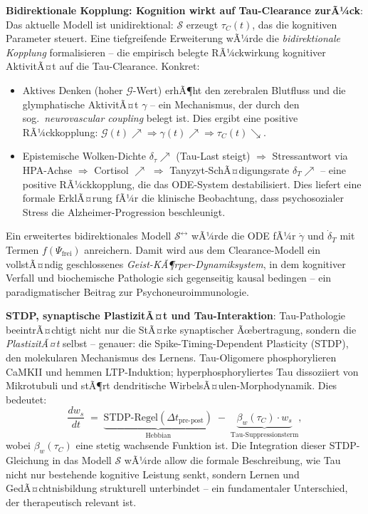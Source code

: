 ﻿\documentclass[12pt,a4paper]{article}
\theoremstyle{definition}
\begin{document}
	\textbf{Bidirektionale Kopplung: Kognition wirkt auf Tau-Clearance zurÃ¼ck}:
	Das aktuelle Modell ist unidirektional: $\mathcal{S}$ erzeugt $\tau_C(t)$, das die kognitiven Parameter steuert. Eine tiefgreifende Erweiterung wÃ¼rde die \emph{bidirektionale Kopplung} formalisieren -- die empirisch belegte RÃ¼ckwirkung kognitiver AktivitÃ¤t auf die Tau-Clearance. Konkret:
	\begin{itemize}
		\item Aktives Denken (hoher $\mathcal{G}$-Wert) erhÃ¶ht den zerebralen Blutfluss und die glymphatische AktivitÃ¤t $\gamma$ -- ein Mechanismus, der durch den sog.\ \emph{neurovascular coupling} belegt ist. Dies ergibt eine positive RÃ¼ckkopplung: $\mathcal{G}(t) \nearrow \Rightarrow \gamma(t) \nearrow \Rightarrow \tau_C(t) \searrow$.
		\item Epistemische Wolken-Dichte $\delta_\tau \nearrow$ (Tau-Last steigt) $\Rightarrow$ Stressantwort via HPA-Achse $\Rightarrow$ Cortisol $\nearrow$ $\Rightarrow$ Tanyzyt-SchÃ¤digungsrate $\delta_T \nearrow$ -- eine positive RÃ¼ckkopplung, die das ODE-System destabilisiert. Dies liefert eine formale ErklÃ¤rung fÃ¼r die klinische Beobachtung, dass psychosozialer Stress die Alzheimer-Progression beschleunigt.
	\end{itemize}
	Ein erweitertes bidirektionales Modell $\mathcal{S}^{\leftrightarrow}$ wÃ¼rde die ODE fÃ¼r $\dot{\gamma}$ und $\dot{\delta}_T$ mit Termen $f(\Psi_{\mathrm{frei}})$ anreichern. Damit wird aus dem Clearance-Modell ein vollstÃ¤ndig geschlossenes \emph{Geist-KÃ¶rper-Dynamiksystem}, in dem kognitiver Verfall und biochemische Pathologie sich gegenseitig kausal bedingen -- ein paradigmatischer Beitrag zur Psychoneuroimmunologie.

	\textbf{STDP, synaptische PlastizitÃ¤t und Tau-Interaktion}:
	Tau-Pathologie beeintrÃ¤chtigt nicht nur die StÃ¤rke synaptischer Ãœbertragung, sondern die \emph{PlastizitÃ¤t} selbst -- genauer: die Spike-Timing-Dependent Plasticity (STDP), den molekularen Mechanismus des Lernens. Tau-Oligomere phosphorylieren CaMKII und hemmen LTP-Induktion; hyperphosphoryliertes Tau dissoziiert von Mikrotubuli und stÃ¶rt dendritische WirbelsÃ¤ulen-Morphodynamik. Dies bedeutet:
	\[
		\frac{d w_s}{dt} \;=\; \underbrace{\text{STDP-Regel}(\Delta t_{\text{pre-post}})}_{\text{Hebbian}} \;-\; \underbrace{\beta_w(\tau_C) \cdot w_s}_{\text{Tau-Suppressionsterm}},
	\]
	wobei $\beta_w(\tau_C)$ eine stetig wachsende Funktion ist. Die Integration dieser STDP-Gleichung in das Modell $\mathcal{S}$ wÃ¼rde allow die formale Beschreibung, wie Tau nicht nur bestehende kognitive Leistung senkt, sondern Lernen und GedÃ¤chtnisbildung strukturell unterbindet -- ein fundamentaler Unterschied, der therapeutisch relevant ist.
\end{document}
